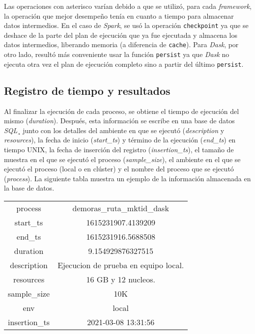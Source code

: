 Las operaciones con asterisco varían debido a que se utilizó, para cada \textit{framework}, la operación que mejor desempeño tenía en cuanto a tiempo para almacenar datos intermedios. En el caso de \textit{Spark}, se usó la operación \texttt{checkpoint} ya que se deshace de la parte del plan de ejecución que ya fue ejecutada y almacena los datos intermedios, liberando memoria (a diferencia de \texttt{cache}). Para \textit{Dask}, por otro lado, resultó más conveniente usar la función \texttt{persist} ya que \textit{Dask} no ejecuta otra vez el plan de ejecución completo sino a partir del último \texttt{persist}.

\subsection{Registro de tiempo y resultados}

Al finalizar la ejecución de cada proceso, se obtiene el tiempo de ejecución del mismo (\textit{duration}). Después, esta información se escribe en una base de datos \textit{SQL}¸ junto con los detalles del ambiente en que se ejecutó (\textit{description} y \textit{resources}), la fecha de inicio (\textit{start\_ts}) y término de la ejecución (\textit{end\_ts}) en tiempo UNIX, la fecha de inserción del registro (\textit{insertion\_ts}), el tamaño de muestra en el que se ejecutó el proceso (\textit{sample\_size}), el ambiente en el que se ejecutó el proceso (local o en clúster) y el nombre del proceso que se ejecutó (\textit{process}). La siguiente tabla muestra un ejemplo de la información almacenada en la base de datos.

\begin{center}
\begin{tabular}{|c|c|}
 \hline
  process & demoras\_ruta\_mktid\_dask \\ 
  start\_ts & 1615231907.4139209 \\
  end\_ts & 1615231916.5688508 \\ 
  duration & 9.154929876327515 \\ 
  description & Ejecucion de prueba en equipo local. \\
  resources & 16 GB y 12 nucleos. \\
  sample\_size & 10K \\
  env & local \\
  insertion\_ts & 2021-03-08 13:31:56 \\
  \hline
\end{tabular}
\end{center}


